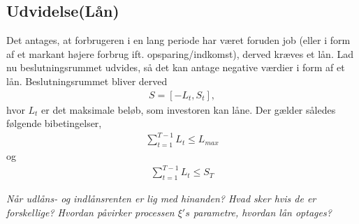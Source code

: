 
\subsection{Udvidelse(Lån)}
Det antages, at forbrugeren i en lang periode har været foruden job (eller i form af et markant højere forbrug ift. opsparing/indkomst), derved kræves et lån.
Lad nu beslutningsrummet udvides, så det kan antage negative værdier i form af et lån.
Beslutningsrummet bliver derved
\begin{align*}
    S = [-L_t, S_t],
\end{align*}
hvor $L_t$ er det maksimale beløb, som investoren kan låne. Der gælder således følgende bibetingelser,
\begin{align*}
    \sum_{t=1}^{T-1} L_t \leq L_{max}
\end{align*}
og
\begin{align*}
    \sum_{t=1}^{T-1} L_t \leq S_T
\end{align*}

\textit{Når udlåns- og indlånsrenten er lig med hinanden? Hvad sker hvis de er forskellige? Hvordan påvirker processen $\xi's$ parametre, hvordan lån optages?}